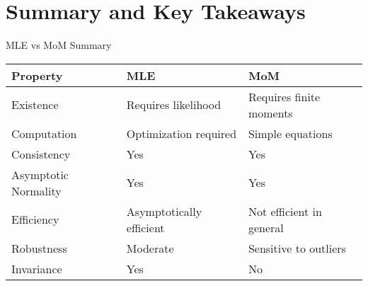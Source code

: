 \section{Summary and Key Takeaways}

\begin{frame}{MLE vs MoM Summary}
  \begin{center}
    \footnotesize
    \begin{tabular}{|l|l|l|}
    \hline
    \textbf{Property} & \textbf{MLE} & \textbf{MoM} \\
    \hline
    Existence & Requires likelihood & Requires finite moments \\
    \hline
    Computation & Optimization required & Simple equations \\
    \hline
    Consistency & Yes & Yes \\
    \hline
    Asymptotic Normality & Yes & Yes \\
    \hline
    Efficiency & Asymptotically efficient & Not efficient in general \\
    \hline
    Robustness & Moderate & Sensitive to outliers \\
    \hline
    Invariance & Yes & No \\
    \hline
    \end{tabular}
  \end{center}

  \vspace{1em}
  \begin{center}
  \begin{adjustbox}{max height=0.40\textheight}
    \end{adjustbox}
  \end{center}
\end{frame}

